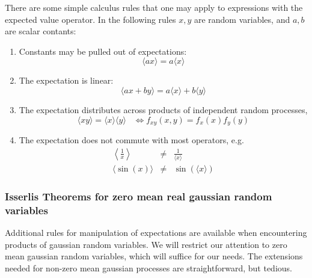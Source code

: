 
There are some simple calculus rules that one may apply to expressions
with the expected value operator.  In the following rules $x, y$ are
random variables, and $a, b$ are scalar contants:
\begin{enumerate}
\item Constants may be pulled out of expectations:
  \begin{displaymath}
  \langle a x \rangle = a \langle x \rangle
  \end{displaymath}
\item The expectation is linear: 
  \begin{displaymath}
  \langle ax + by \rangle = a \langle x \rangle + b \langle y \rangle
  \end{displaymath}
\item The expectation distributes across products of independent
  random processes,
  \begin{displaymath}
  \langle x y \rangle = \langle x \rangle \langle y \rangle \;\;\;
  \iff f_{xy}(x, y) = f_x(x) f_y(y)
  \end{displaymath}
\item The expectation does not commute with most operators, e.g.
  \begin{eqnarray*}
  \left\langle \frac{1}{x} \right\rangle &\ne & \frac{1}{\langle x \rangle} \\
  \langle \sin(x) \rangle &\ne & \sin(\langle x \rangle)
  \end{eqnarray*}
\end{enumerate}

\subsubsection{Isserlis Theorems for zero mean real gaussian random variables}

Additional rules for manipulation of expectations are available when
encountering products of gaussian random variables.  We will restrict
our attention to zero mean gaussian random variables, which will
suffice for our needs.  The extensions needed for non-zero mean
gaussian processes are straightforward, but tedious.

